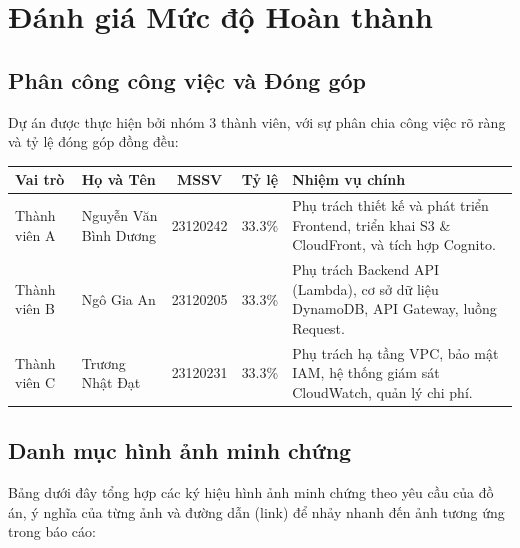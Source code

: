 \documentclass[13pt]{article}
\begin{document}
\newpage
\tableofcontents
\newpage

\section{Đánh giá Mức độ Hoàn thành}
\subsection{Phân công công việc và Đóng góp}
Dự án được thực hiện bởi nhóm 3 thành viên, với sự phân chia công việc rõ ràng và tỷ lệ đóng góp đồng đều:
\begin{longtable}{|p{}|p{}|c|c|p{}|}
\hline
\textbf{Vai trò} & \textbf{Họ và Tên} & \textbf{MSSV} & \textbf{Tỷ lệ} & \textbf{Nhiệm vụ chính} \\ \hline
\endhead
Thành viên A & Nguyễn Văn Bình Dương & 23120242 & 33.3\% & Phụ trách thiết kế và phát triển Frontend, triển khai S3 \& CloudFront, và tích hợp Cognito. \\ \hline
Thành viên B & Ngô Gia An & 23120205 & 33.3\% & Phụ trách Backend API (Lambda), cơ sở dữ liệu DynamoDB, API Gateway, luồng Request. \\ \hline
Thành viên C & Trương Nhật Đạt & 23120231 & 33.3\% & Phụ trách hạ tầng VPC, bảo mật IAM, hệ thống giám sát CloudWatch, quản lý chi phí. \\ \hline
\end{longtable}

\subsection{Danh mục hình ảnh minh chứng}
Bảng dưới đây tổng hợp các ký hiệu hình ảnh minh chứng theo yêu cầu của đồ án, ý nghĩa của từng ảnh và đường dẫn (link) để nhảy nhanh đến ảnh tương ứng trong báo cáo:
\end{document}
